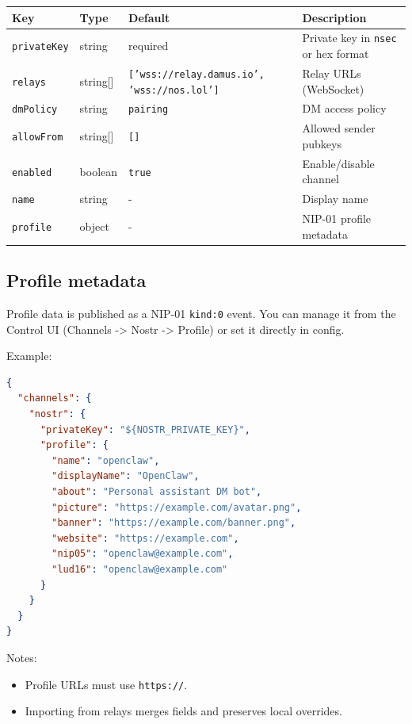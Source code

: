 \begin{table}[h]
\centering
\small
\begin{tabular}{|l|l|l|l|}
\hline
Key & Type & Default & Description \\
\hline
\texttt{privateKey} & string & required & Private key in \texttt{nsec} or hex format \\
\hline
\texttt{relays} & string[] & \texttt{['wss://relay.damus.io', 'wss://nos.lol']} & Relay URLs (WebSocket) \\
\hline
\texttt{dmPolicy} & string & \texttt{pairing} & DM access policy \\
\hline
\texttt{allowFrom} & string[] & \texttt{[]} & Allowed sender pubkeys \\
\hline
\texttt{enabled} & boolean & \texttt{true} & Enable/disable channel \\
\hline
\texttt{name} & string & - & Display name \\
\hline
\texttt{profile} & object & - & NIP-01 profile metadata \\
\hline
\end{tabular}
\end{table}



\subsection{Profile metadata}


Profile data is published as a NIP-01 \texttt{kind:0} event. You can manage it from the Control UI (Channels -> Nostr -> Profile) or set it directly in config.

Example:

\begin{lstlisting}[language=json]
{
  "channels": {
    "nostr": {
      "privateKey": "${NOSTR_PRIVATE_KEY}",
      "profile": {
        "name": "openclaw",
        "displayName": "OpenClaw",
        "about": "Personal assistant DM bot",
        "picture": "https://example.com/avatar.png",
        "banner": "https://example.com/banner.png",
        "website": "https://example.com",
        "nip05": "openclaw@example.com",
        "lud16": "openclaw@example.com"
      }
    }
  }
}
\end{lstlisting}


Notes:

\begin{itemize}
  \item Profile URLs must use \texttt{https://}.
  \item Importing from relays merges fields and preserves local overrides.
\end{itemize}


